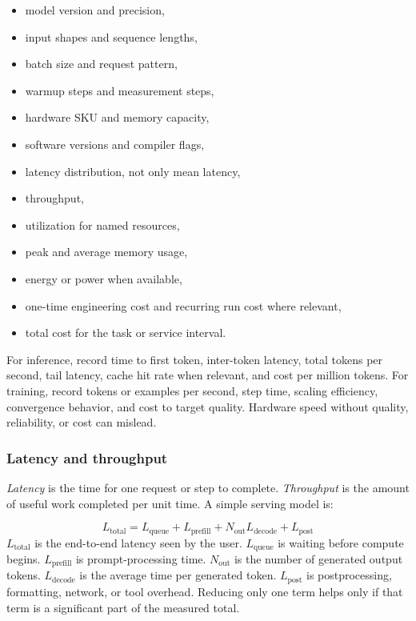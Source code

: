 \begin{itemize}[leftmargin=*]
  \item model version and precision,
  \item input shapes and sequence lengths,
  \item batch size and request pattern,
  \item warmup steps and measurement steps,
  \item hardware SKU and memory capacity,
  \item software versions and compiler flags,
  \item latency distribution, not only mean latency,
  \item throughput,
  \item utilization for named resources,
  \item peak and average memory usage,
  \item energy or power when available,
  \item one-time engineering cost and recurring run cost where relevant,
  \item total cost for the task or service interval.
\end{itemize}

For inference, record time to first token, inter-token latency, total tokens per second, tail latency, cache hit rate when relevant, and cost per million tokens. For training, record tokens or examples per second, step time, scaling efficiency, convergence behavior, and cost to target quality. Hardware speed without quality, reliability, or cost can mislead.

\subsubsection{Latency and throughput}

\emph{Latency} is the time for one request or step to complete. \emph{Throughput} is the amount of useful work completed per unit time. A simple serving model is:

\begin{keyequation}
\[
  L_{\text{total}}
  =
  L_{\text{queue}}
  +
  L_{\text{prefill}}
  +
  N_{\text{out}} L_{\text{decode}}
  +
  L_{\text{post}}
\]
\tcblower
\(L_{\text{total}}\) is the end-to-end latency seen by the user. \(L_{\text{queue}}\) is waiting before compute begins. \(L_{\text{prefill}}\) is prompt-processing time. \(N_{\text{out}}\) is the number of generated output tokens. \(L_{\text{decode}}\) is the average time per generated token. \(L_{\text{post}}\) is postprocessing, formatting, network, or tool overhead. Reducing only one term helps only if that term is a significant part of the measured total.
\end{keyequation}

